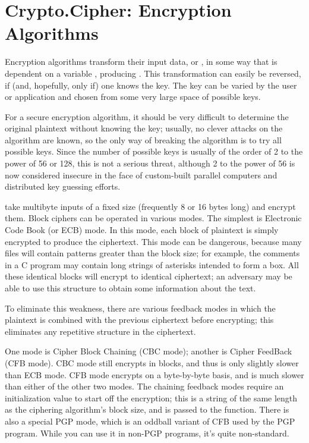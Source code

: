 \documentclass{howto}
\begin{document}
\section{Crypto.Cipher: Encryption Algorithms}

Encryption algorithms transform their input data, or ,
in some way that is dependent on a variable , producing
. This transformation can easily be reversed, if (and,
hopefully, only if) one knows the key.  The key can be varied by the
user or application and chosen from some very large space of possible
keys.

For a secure encryption algorithm, it should be very difficult to
determine the original plaintext without knowing the key; usually, no
clever attacks on the algorithm are known, so the only way of breaking
the algorithm is to try all possible keys. Since the number of possible
keys is usually of the order of 2 to the power of 56 or 128, this is not
a serious threat, although 2 to the power of 56 is now considered
insecure in the face of custom-built parallel computers and distributed
key guessing efforts.

 take multibyte inputs of a fixed size
(frequently 8 or 16 bytes long) and encrypt them.  Block ciphers can
be operated in various modes.  The simplest is Electronic Code Book
(or ECB) mode.  In this mode, each block of plaintext is simply
encrypted to produce the ciphertext.  This mode can be dangerous,
because many files will contain patterns greater than the block size;
for example, the comments in a C program may contain long strings of
asterisks intended to form a box.  All these identical blocks will
encrypt to identical ciphertext; an adversary may be able to use this
structure to obtain some information about the text.

To eliminate this weakness, there are various feedback modes in which
the plaintext is combined with the previous ciphertext before
encrypting; this eliminates any repetitive structure in the
ciphertext.

One mode is Cipher Block Chaining (CBC mode); another is Cipher
FeedBack (CFB mode).  CBC mode still encrypts in blocks, and thus is
only slightly slower than ECB mode.  CFB mode encrypts on a
byte-by-byte basis, and is much slower than either of the other two
modes.  The chaining feedback modes require an initialization value to
start off the encryption; this is a string of the same length as the
ciphering algorithm's block size, and is passed to the 
function.  There is also a special PGP mode, which is an oddball
variant of CFB used by the PGP program.  While you can use it in
non-PGP programs, it's quite non-standard.
\end{document}
